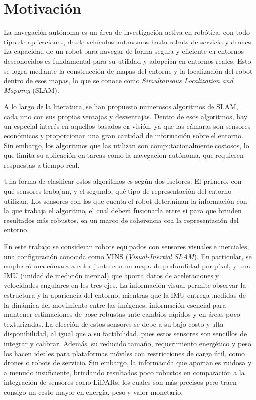 \section{Motivación}

La navegación autónoma es un área de investigación activa en robótica, con todo tipo de aplicaciones, desde vehículos autónomos hasta robots de servicio y drones. La capacidad de un robot para navegar de forma segura y eficiente en entornos desconocidos es fundamental para su utilidad y adopción en entornos reales. Esto se logra mediante la construcción de mapas del entorno y la localización del robot dentro de esos mapas, lo que se conoce como \textit{Simultaneous Localization and Mapping} (SLAM). 

A lo largo de la literatura, se han propuesto numerosos algoritmos de SLAM, cada uno con sus propias ventajas y desventajas. Dentro de esos algoritmos, hay un especial interés en aquellos basados en visión, ya que las cámaras son sensores económicos y proporcionan una gran cantidad de información sobre el entorno. Sin embargo, los algoritmos que las utilizan son computacionalmente costosos, lo que limita su aplicación en tareas como la navegacion autónoma, que requieren respuestas a tiempo real.

Una forma de clasificar estos algoritmos es según dos factores: El primero, con qué sensores trabajan, y el segundo, qué tipo de representación del entorno utilizan. Los sensores con los que cuenta el robot determinan la información con la que trabaja el algoritmo, el cual deberá fusionarla entre sí para que brinden resultados más robustos, en un marco de coherencia con la representación del entorno.

En este trabajo se consideran robots equipados con sensores visuales e inerciales, una configuración conocida como VINS (\textit{Visual-Inertial SLAM}). En particular, se empleará una cámara a color junto con un mapa de profundidad por píxel, y una IMU (unidad de medición inercial) que aporta datos de aceleraciones y velocidades angulares en los tres ejes. La información visual permite observar la estructura y la apariencia del entorno, mientras que la IMU entrega medidas de la dinámica del movimiento entre las imágenes, información esencial para mantener estimaciones de pose robustas ante cambios rápidos y en áreas poco texturizadas. La elección de estos sensores se debe a su bajo costo y alta disponibilidad, al igual que a su factibilidad, pues estos sensores son sencillos de integrar y calibrar. Además, su reducido tamaño, requerimiento energético y peso los hacen ideales para plataformas móviles con restricciones de carga útil, como drones o robots de servicio. Sin embargo, la información que aportan es ruidosa y a menudo insuficiente, brindando resultados poco robustos en comparación a la integración de sensores como LiDARs, los cuales son más precisos pero traen consigo un costo mayor en energía, peso y valor monetario.

